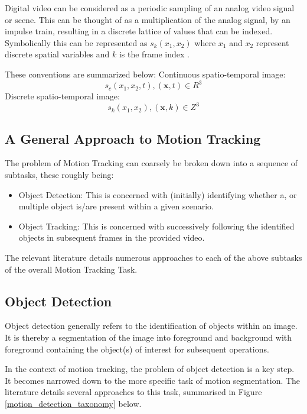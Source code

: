 Digital video can be considered as a periodic sampling of an analog video signal
or scene. This can be thought of as a multiplication of the analog signal, by an
impulse train, resulting in a discrete lattice of values that can be indexed.
Symbolically this can be represented as $s_k(x_1,x_2)$ where $x_1$ and
$x_2$ represent discrete spatial variables and $k$ is the frame index
\cite{Tekalp2014}. 

These conventions are summarized below: \newline
Continuous spatio-temporal image:
$$s_c(x_1,x_2,t), (\textbf{x},t) \in R^3$$ \newline 
Discrete spatio-temporal image:
$$s_k(x_1,x_2), (\textbf{x},k) \in Z^3$$ 
    
\subsection{A General Approach to Motion Tracking}\label{literature_review_general_approach}
The problem of Motion Tracking can coarsely be broken down into a sequence of
subtasks, these roughly being:
    \begin{itemize}
        \item Object Detection: This is concerned with (initially) identifying
            whether a, or multiple object is/are present within a given scenario.
        \item Object Tracking: This is concerned with successively following the
            identified objects in subsequent frames in the provided video.
    \end{itemize}
The relevant literature details numerous approaches to each of the above
subtasks of the overall Motion Tracking Task. 


\subsection{Object Detection}
Object detection generally refers to the identification of objects within
an image. It is thereby a segmentation of the image into foreground
and background with foreground containing the object(s) of interest for subsequent
operations.

In the context of motion tracking, the problem of object detection is a key
step. It becomes narrowed down to the more specific task of motion segmentation.
The literature details several approaches to this task, summarised in 
Figure \ref{motion_detection_taxonomy} below.


